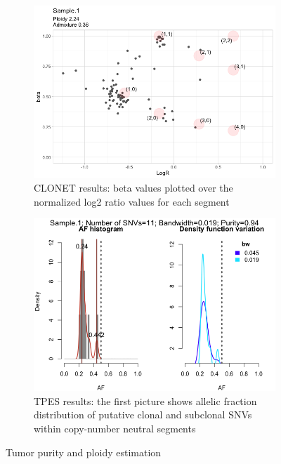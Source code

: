 \documentclass[11pt]{article}
\begin{document}
\begin{figure}[H]
\centering
\begin{subfigure}{.47\textwidth}
    \centering
    \includegraphics[width=\linewidth]{images/check_plot.png}
    \caption{\label{clonet}\footnotesize{CLONET results: beta values plotted over the normalized log2 ratio values for each segment}}
\end{subfigure}
%
\begin{subfigure}{.47\textwidth}
    \centering
    \includegraphics[width=\linewidth]{images/TPES.png}
    \caption{\label{tpes}\footnotesize{TPES results: the first picture shows allelic fraction distribution of putative clonal and subclonal SNVs within copy-number neutral segments}}
\end{subfigure}
\caption{\footnotesize{Tumor purity and ploidy estimation}}
\end{figure}
\end{document}
